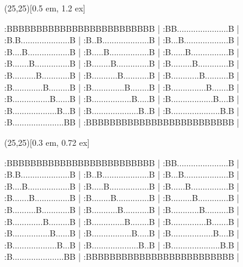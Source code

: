 \documentclass[12pt]{article}
\begin{document}
\def\hboxtr{\FormOfHboxtr} %
\sprite{\FormOfHboxtr}(25,25)[0.5 em, 1.2 ex] %


:BBBBBBBBBBBBBBBBBBBBBBBBB |
:BB......................B |
:B.B.....................B |
:B..B....................B |
:B...B...................B |
:B....B..................B |
:B.....B.................B |
:B......B................B |
:B.......B...............B |
:B........B..............B |
:B.........B.............B |
:B..........B............B |
:B...........B...........B |
:B............B..........B |
:B.............B.........B |
:B..............B........B |
:B...............B.......B |
:B................B......B |
:B.................B.....B |
:B..................B....B |
:B...................B...B |
:B....................B..B |
:B.....................B.B |
:B......................BB |
:BBBBBBBBBBBBBBBBBBBBBBBBB |





\endsprite

\def\shboxtr{\FormOfShboxtr} %
\sprite{\FormOfShboxtr}(25,25)[0.3 em, 0.72 ex] %


:BBBBBBBBBBBBBBBBBBBBBBBBB |
:BB......................B |
:B.B.....................B |
:B..B....................B |
:B...B...................B |
:B....B..................B |
:B.....B.................B |
:B......B................B |
:B.......B...............B |
:B........B..............B |
:B.........B.............B |
:B..........B............B |
:B...........B...........B |
:B............B..........B |
:B.............B.........B |
:B..............B........B |
:B...............B.......B |
:B................B......B |
:B.................B.....B |
:B..................B....B |
:B...................B...B |
:B....................B..B |
:B.....................B.B |
:B......................BB |
:BBBBBBBBBBBBBBBBBBBBBBBBB |





\endsprite

\end{document}
